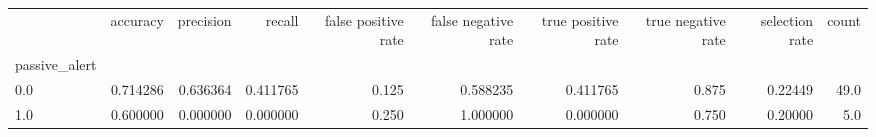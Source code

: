 \begin{tabular}{lrrrrrrrrr}
\toprule
{} &  accuracy &  precision &    recall &  false positive rate &  false negative rate &  true positive rate &  true negative rate &  selection rate &  count \\
passive\_alert &           &            &           &                      &                      &                     &                     &                 &        \\
\midrule
0.0           &  0.714286 &   0.636364 &  0.411765 &                0.125 &             0.588235 &            0.411765 &               0.875 &         0.22449 &   49.0 \\
1.0           &  0.600000 &   0.000000 &  0.000000 &                0.250 &             1.000000 &            0.000000 &               0.750 &         0.20000 &    5.0 \\
\bottomrule
\end{tabular}
